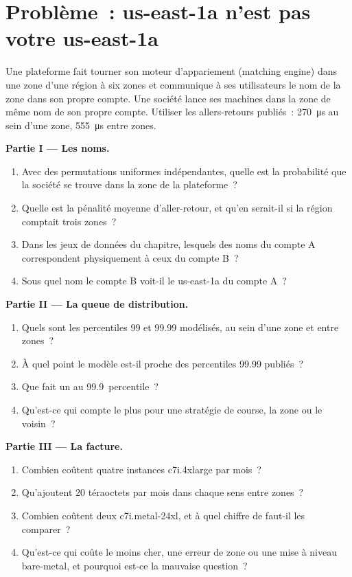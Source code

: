 \section{Problème~: us-east-1a n'est pas votre us-east-1a}

\begin{problem}\label{pb:nw:trading-in-a-public-cloud:1}
Une plateforme fait tourner son moteur d'appariement (matching engine) dans une zone d'une région à six zones et communique à ses utilisateurs le nom de la zone dans son propre compte. Une société lance ses machines
dans la zone de même nom de son propre compte. Utiliser les allers-retours publiés~: \qty{270}{\micro\second} au sein d'une zone, \qty{555}{\micro\second} entre zones.

\medskip\noindent\textbf{Partie I --- Les noms.}
\begin{enumerate}
\item Avec des permutations uniformes indépendantes, quelle est la probabilité que la société se trouve dans la zone de la plateforme~?
\item Quelle est la pénalité moyenne d'aller-retour, et qu'en serait-il si la région comptait trois zones~?
\item Dans les jeux de données du chapitre, lesquels des noms du compte A correspondent physiquement à ceux du compte B~?
\item Sous quel nom le compte B voit-il le us-east-1a du compte A~?
\end{enumerate}

\medskip\noindent\textbf{Partie II --- La queue de distribution.}
\begin{enumerate}[resume]
\item Quels sont les percentiles 99 et 99.99 modélisés, au sein d'une zone et entre zones~?
\item À quel point le modèle est-il proche des percentiles 99.99 publiés~?
\item Que fait un  au 99.9~percentile~?
\item Qu'est-ce qui compte le plus pour une stratégie de course, la zone ou le voisin~?
\end{enumerate}

\medskip\noindent\textbf{Partie III --- La facture.}
\begin{enumerate}[resume]
\item Combien coûtent quatre instances c7i.4xlarge par mois~?
\item Qu'ajoutent 20 téraoctets par mois dans chaque sens entre zones~?
\item Combien coûtent deux  c7i.metal-24xl, et à quel chiffre de  faut-il les comparer~?
\item Qu'est-ce qui coûte le moins cher, une erreur de zone ou une mise à niveau bare-metal, et pourquoi est-ce la mauvaise question~?
\end{enumerate}


\end{problem}
